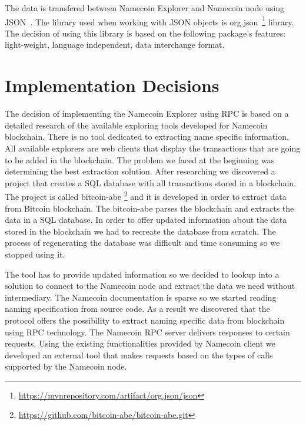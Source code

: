 The data is transfered between Namecoin Explorer and Namecoin node using JSON~\cite{rfc7159}. The library used when working with JSON objects is org.json~\footnote{\url{https://mvnrepository.com/artifact/org.json/json}} library. The decision of using this library is based on the following package's features: light-weight, language independent, data interchange format. 


\section{Implementation Decisions}
\label{sec:imp-dec-lbl}
The decision of implementing the Namecoin Explorer using RPC is based on a detailed research of the available exploring tools developed for Namecoin blockchain. There is no tool dedicated to extracting name specific information.
All available explorers are web clients that display the transactions that are going to be added in the blockchain.
The problem we faced at the beginning was determining the best extraction solution.
After researching we discovered a project that creates a SQL database with all transactions stored in a blockchain. The project is called bitcoin-abe  \footnote{\url{https://github.com/bitcoin-abe/bitcoin-abe.git}} and it is developed in order to extract data from Bitcoin blockchain.
The bitcoin-abe parses the blockchain and extracts the data in a SQL database. In order to offer updated information about the data stored in the blockchain we had to recreate the database from scratch. The process of regenerating the database was difficult and time consuming so we stopped using it.

The tool has to provide updated information so we decided to lookup into a solution to connect to the Namecoin node and extract the data we need without intermediary. The Namecoin documentation is sparse so we started reading naming specification from source code. As a result we discovered that the protocol offers the possibility to extract naming specific data from blockchain using RPC technology. The Namecoin RPC server delivers responses to certain requests. Using the existing functionalities provided by Namecoin client we developed an external tool that makes requests based on the types of calls supported by the Namecoin node. 

